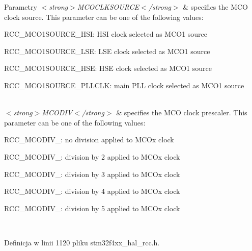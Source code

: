 \begin{DoxyParams}{Parametry}
{\em $<$strong$>$\+M\+C\+O\+C\+L\+K\+S\+O\+U\+R\+C\+E$<$/strong$>$} & specifies the M\+CO clock source. This parameter can be one of the following values\+: \begin{DoxyItemize}
\item R\+C\+C\+\_\+\+M\+C\+O1\+S\+O\+U\+R\+C\+E\+\_\+\+H\+SI\+: H\+SI clock selected as M\+C\+O1 source \item R\+C\+C\+\_\+\+M\+C\+O1\+S\+O\+U\+R\+C\+E\+\_\+\+L\+SE\+: L\+SE clock selected as M\+C\+O1 source \item R\+C\+C\+\_\+\+M\+C\+O1\+S\+O\+U\+R\+C\+E\+\_\+\+H\+SE\+: H\+SE clock selected as M\+C\+O1 source \item R\+C\+C\+\_\+\+M\+C\+O1\+S\+O\+U\+R\+C\+E\+\_\+\+P\+L\+L\+C\+LK\+: main P\+LL clock selected as M\+C\+O1 source \end{DoxyItemize}
\\
\hline
{\em $<$strong$>$\+M\+C\+O\+D\+I\+V$<$/strong$>$} & specifies the M\+CO clock prescaler. This parameter can be one of the following values\+: \begin{DoxyItemize}
\item R\+C\+C\+\_\+\+M\+C\+O\+D\+I\+V\+\_\+: no division applied to M\+C\+Ox clock \item R\+C\+C\+\_\+\+M\+C\+O\+D\+I\+V\+\_\+: division by 2 applied to M\+C\+Ox clock \item R\+C\+C\+\_\+\+M\+C\+O\+D\+I\+V\+\_\+: division by 3 applied to M\+C\+Ox clock \item R\+C\+C\+\_\+\+M\+C\+O\+D\+I\+V\+\_\+: division by 4 applied to M\+C\+Ox clock \item R\+C\+C\+\_\+\+M\+C\+O\+D\+I\+V\+\_\+: division by 5 applied to M\+C\+Ox clock \end{DoxyItemize}
\\
\hline
\end{DoxyParams}


Definicja w linii 1120 pliku stm32f4xx\+\_\+hal\+\_\+rcc.\+h.

\mbox{\label{group___r_c_c_ex___m_c_ox___clock___config_gabb7360422910dd65312786fc49722d25}} 
